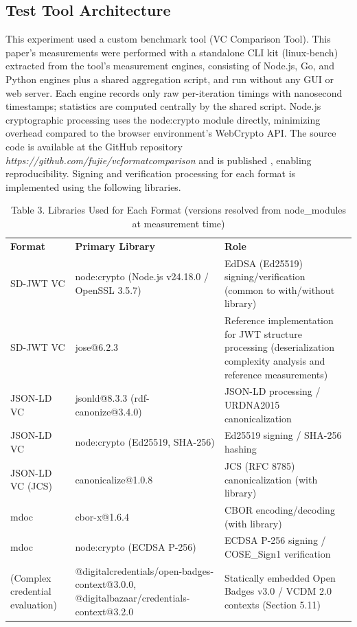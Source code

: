 \documentclass[conference]{IEEEtran}
\begin{document}
\subsection{Test Tool Architecture}

This experiment used a custom benchmark tool (VC Comparison Tool). This paper's measurements were performed with a standalone CLI kit (linux-bench) extracted from the tool's measurement engines, consisting of Node.js, Go, and Python engines plus a shared aggregation script, and run without any GUI or web server. Each engine records only raw per-iteration timings with nanosecond timestamps; statistics are computed centrally by the shared script. Node.js cryptographic processing uses the node:crypto module directly, minimizing overhead compared to the browser environment's WebCrypto API. The source code is available at the GitHub repository \emph{https://github.com/fujie/vcformatcomparison} and is published \cite{ref14}, enabling reproducibility. Signing and verification processing for each format is implemented using the following libraries.


\begin{table}[!t]
\centering
\caption{Table 3. Libraries Used for Each Format (versions resolved from node\_modules at measurement time)}\label{tab:3}
\footnotesize
\begin{tabular}{>{\raggedright\arraybackslash}p{}>{\raggedright\arraybackslash}p{}>{\raggedright\arraybackslash}p{}}
\toprule

\textbf{Format} & \textbf{Primary Library} & \textbf{Role}\tabularnewline
SD-JWT VC & node:crypto (Node.js v24.18.0 / OpenSSL 3.5.7) & EdDSA (Ed25519) signing/verification (common to with/without library)\tabularnewline
SD-JWT VC & jose@6.2.3 & Reference implementation for JWT structure processing (deserialization complexity analysis and reference measurements)\tabularnewline
JSON-LD VC & jsonld@8.3.3 (rdf-canonize@3.4.0) & JSON-LD processing / URDNA2015 canonicalization\tabularnewline
JSON-LD VC & node:crypto (Ed25519, SHA-256) & Ed25519 signing / SHA-256 hashing\tabularnewline
JSON-LD VC (JCS) & canonicalize@1.0.8 & JCS (RFC 8785) canonicalization (with library)\tabularnewline
mdoc & cbor-x@1.6.4 & CBOR encoding/decoding (with library)\tabularnewline
mdoc & node:crypto (ECDSA P-256) & ECDSA P-256 signing / COSE\_Sign1 verification\tabularnewline
(Complex credential evaluation) & @digitalcredentials/open-badges-context@3.0.0, @digitalbazaar/credentials-context@3.2.0 & Statically embedded Open Badges v3.0 / VCDM 2.0 contexts (Section 5.11)\tabularnewline
\bottomrule
\end{tabular}
\end{table}
\end{document}
